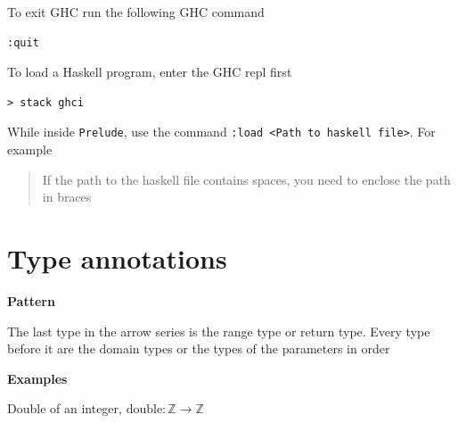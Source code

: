 To exit GHC run the following GHC command

\begin{verbatim}
:quit
\end{verbatim}

To load a Haskell program, enter the GHC repl first

\begin{verbatim}
> stack ghci
\end{verbatim}

While inside \texttt{Prelude}, use the command
\texttt{:load\ \textless{}Path\ to\ haskell\ file\textgreater{}}. For
example

\begin{Shaded}
\begin{Highlighting}[]
\OperatorTok{\textgreater{}} \OperatorTok{:}
\end{Highlighting}
\end{Shaded}

\begin{quote}
If the path to the haskell file contains spaces, you need to enclose the
path in braces
\end{quote}

\section{Type
annotations}\label{haskell-cheat-sheet.md__type-annotations}

\textbf{Pattern}

The last type in the arrow series is the range type or return type.
Every type before it are the domain types or the types of the parameters
in order

\begin{Shaded}
\begin{Highlighting}[]
  \OtherTok{{-}\textgreater{}}  \OtherTok{{-}\textgreater{}}  \OtherTok{{-}\textgreater{}}  \OtherTok{{-}\textgreater{}} 
\end{Highlighting}
\end{Shaded}

\textbf{Examples}

Double of an integer, \(\text{double} : \mathbb{Z} \to \mathbb{Z}\)

\begin{Shaded}
\begin{Highlighting}[]
  \OtherTok{{-}\textgreater{}} 
\end{Highlighting}
\end{Shaded}

